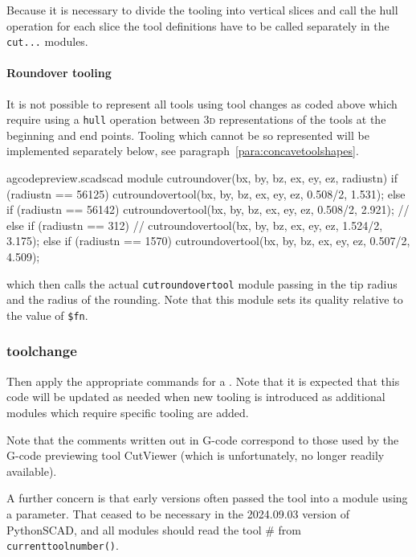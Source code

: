 \documentclass{ltxdoc}
\begin{document}
Because it is necessary to divide the tooling into vertical slices and call the hull operation for each slice the tool definitions have to be called separately in the \verb|cut...| modules.

\paragraph{Roundover tooling}

\label{para:roundover} It is not possible to represent all tools using tool changes as coded above which require using a \texttt{hull} operation between \textsc{3d} representations of the tools at the beginning and end points. Tooling which cannot be so represented will be implemented separately below, see paragraph~\ref{para:concavetoolshapes}.

\lstset{firstnumber=\thegcpscad}
\begin{writecode}{a}{gcodepreview.scad}{scad}
module cutroundover(bx, by, bz, ex, ey, ez, radiustn) {
    if (radiustn == 56125) {
        cutroundovertool(bx, by, bz, ex, ey, ez, 0.508/2, 1.531);
    } else if (radiustn == 56142) {
        cutroundovertool(bx, by, bz, ex, ey, ez, 0.508/2, 2.921);
//    } else if (radiustn == 312) {
//        cutroundovertool(bx, by, bz, ex, ey, ez, 1.524/2, 3.175);
    } else if (radiustn == 1570) {
        cutroundovertool(bx, by, bz, ex, ey, ez, 0.507/2, 4.509);
    }
}

\end{writecode}
\addtocounter{gcpscad}{12}

\noindent which then calls the actual \texttt{cutroundovertool} module passing in the tip radius and the radius of the rounding. Note that this module sets its quality relative to the value of \verb|$fn|.

\subsubsection{toolchange}

Then apply the appropriate commands for a \label{subsubsec:toolchange} . Note that it is expected that this code will be updated as needed when new tooling is introduced as additional modules which require specific tooling are added. 

Note that the comments written out in G-code correspond to those used by the G-code previewing tool CutViewer (which is unfortunately, no longer readily available).

A further concern is that early versions often passed the tool into a module using a parameter. That ceased to be necessary in the 2024.09.03 version of PythonSCAD, and all modules should read the tool \# from \verb|currenttoolnumber()|. %
\end{document}
